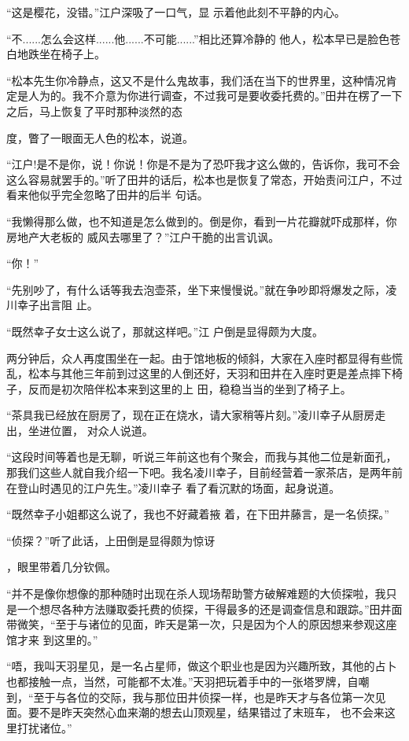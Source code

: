 \documentclass{article}
\begin{document}
“这是樱花，没错。”江户深吸了一口气，显
示着他此刻不平静的内心。 

“不......怎么会这样......他......不可能......”相比还算冷静的
他人，松本早已是脸色苍白地跌坐在椅子上。 

“松本先生你冷静点，这又不是什么鬼故事，我们活在当下的世界里，这种情况肯定是人为的。我不介意为你进行调查，不过我可是要收委托费的。”田井在楞了一下之后，马上恢复了平时那种淡然的态
\newpage

度，瞥了一眼面无人色的松本，说道。 

“江户!是不是你，说！你说！你是不是为了恐吓我才这么做的，告诉你，我可不会这么容易就罢手的。”听了田井的话后，松本也是恢复了常态，开始责问江户，不过看来他似乎完全忽略了田井的后半
句话。 

“我懒得那么做，也不知道是怎么做到的。倒是你，看到一片花瓣就吓成那样，你房地产大老板的
威风去哪里了？”江户干脆的出言讥讽。 


“你！” 

“先别吵了，有什么话等我去泡壶茶，坐下来慢慢说。”就在争吵即将爆发之际，凌川幸子出言阻
止。 

“既然幸子女士这么说了，那就这样吧。”江
户倒是显得颇为大度。 

\newpage

两分钟后，众人再度围坐在一起。由于馆地板的倾斜，大家在入座时都显得有些慌乱，松本与其他三年前到过这里的人倒还好，天羽和田井在入座时更是差点摔下椅子，反而是初次陪伴松本来到这里的上
田，稳稳当当的坐到了椅子上。 

“茶具我已经放在厨房了，现在正在烧水，请大家稍等片刻。”凌川幸子从厨房走出，坐进位置，
对众人说道。 

“这段时间等着也是无聊，听说三年前这也有个聚会，而我与其他二位是新面孔，那我们这些人就自我介绍一下吧。我名凌川幸子，目前经营着一家茶店，是两年前在登山时遇见的江户先生。”凌川幸子
看了看沉默的场面，起身说道。 

“既然幸子小姐都这么说了，我也不好藏着掖
着，在下田井藤言，是一名侦探。” 

“侦探？”听了此话，上田倒是显得颇为惊讶

\newpage
，眼里带着几分钦佩。 

“并不是像你想像的那种随时出现在杀人现场帮助警方破解难题的大侦探啦，我只是一个想尽各种方法赚取委托费的侦探，干得最多的还是调查信息和跟踪。”田井面带微笑，“至于与诸位的见面，昨天是第一次，只是因为个人的原因想来参观这座馆才来
到这里的。” 

“唔，我叫天羽星见，是一名占星师，做这个职业也是因为兴趣所致，其他的占卜也都接触一点，当然，可能都不太准。”天羽把玩着手中的一张塔罗牌，自嘲到，“至于与各位的交际，我与那位田井侦探一样，也是昨天才与各位第一次见面。要不是昨天突然心血来潮的想去山顶观星，结果错过了末班车，
也不会来这里打扰诸位。” 
\end{document}
